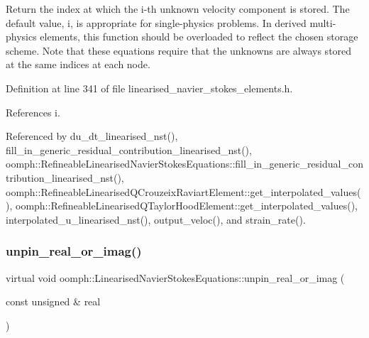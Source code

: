 Return the index at which the i-\/th unknown velocity component is stored. The default value, i, is appropriate for single-\/physics problems. In derived multi-\/physics elements, this function should be overloaded to reflect the chosen storage scheme. Note that these equations require that the unknowns are always stored at the same indices at each node. 



Definition at line 341 of file linearised\+\_\+navier\+\_\+stokes\+\_\+elements.\+h.



References i.



Referenced by du\+\_\+dt\+\_\+linearised\+\_\+nst(), fill\+\_\+in\+\_\+generic\+\_\+residual\+\_\+contribution\+\_\+linearised\+\_\+nst(), oomph\+::\+Refineable\+Linearised\+Navier\+Stokes\+Equations\+::fill\+\_\+in\+\_\+generic\+\_\+residual\+\_\+contribution\+\_\+linearised\+\_\+nst(), oomph\+::\+Refineable\+Linearised\+Q\+Crouzeix\+Raviart\+Element\+::get\+\_\+interpolated\+\_\+values(), oomph\+::\+Refineable\+Linearised\+Q\+Taylor\+Hood\+Element\+::get\+\_\+interpolated\+\_\+values(), interpolated\+\_\+u\+\_\+linearised\+\_\+nst(), output\+\_\+veloc(), and strain\+\_\+rate().

\mbox{\label{classoomph_1_1LinearisedNavierStokesEquations_ae23ea66f0fd2679658946f790bd53ccd}} 
\subsubsection{\texorpdfstring{unpin\+\_\+real\+\_\+or\+\_\+imag()}{unpin\_real\_or\_imag()}}
{\footnotesize\ttfamily virtual void oomph\+::\+Linearised\+Navier\+Stokes\+Equations\+::unpin\+\_\+real\+\_\+or\+\_\+imag (\begin{DoxyParamCaption}\item[{const unsigned \&}]{real }\end{DoxyParamCaption})\hspace{0.3cm}{\ttfamily [pure virtual]}}



